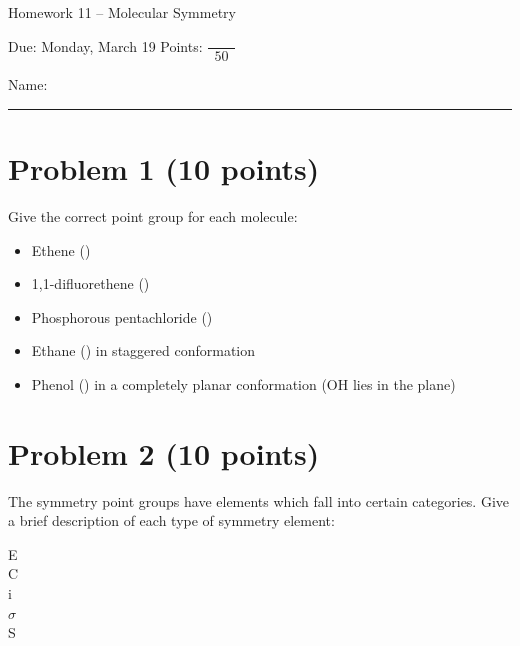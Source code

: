 \documentclass[10pt, letterpaper]{memoir}
\begin{document}
\begin{center}
	{\large Homework 11 -- Molecular Symmetry}
	
	Due: Monday, March 19 \hspace{3em} Points: ${\dfrac{~}{~~50~~}}$
\end{center}

Name: \rule[-.1mm]{15em}{0.1pt}	
	
	\section*{Problem 1 (10 points)}
	Give the correct point group for each molecule:
	
	\begin{itemize}
		\item Ethene ()
		
		\vspace{2em}
		\item 1,1-difluorethene ()
		
		\vspace{2em}
		\item Phosphorous pentachloride ()
		
		\vspace{2em}
		\item Ethane () in staggered conformation
		
		\vspace{2em}
		\item Phenol () in a completely planar conformation (OH lies in the plane)
		
		\vspace{2em}
	\end{itemize}

	\section*{Problem 2 (10 points)}
	The symmetry point groups have elements which fall into certain categories. Give a brief description of each type of symmetry element:
	
	\begin{description}
		\item[E]
		\vspace{1em}
		\item[C]
		
		\vspace{3em}
		\item[i]
		
		\vspace{3em}
		\item[$\sigma$]
		
		\vspace{3em}
		\item[S]
		
		\vspace{3em}
	\end{description}
\end{document}
